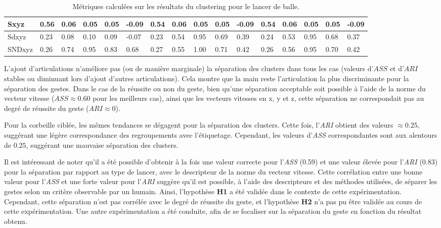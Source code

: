 \begin{landscape}
\begin{table}[]
\begin{tabular}{|l|l|l|l|l|l|l|l|l|l|l|l|l|l|l|l|}
Sxyz   & \cellcolor{green!25} 0.56 & 0.06 & 0.05 & 0.05 & -0.09 & 0.54 & 0.06 & 0.05 & 0.05 & -0.09 & 0.54 & 0.06 & 0.05 & 0.05 & -0.09 \\ \hline
Sdxyz  & 0.23 & 0.08 & 0.10 & 0.09 & -0.07 & 0.23 & 0.54 & 0.95 & 0.69 & 0.39  & 0.24 & 0.53 & 0.95 & 0.68 & 0.37  \\ \hline
SNDxyz & 0.26 & 0.74 & 0.95 & 0.83 & 0.68  & 0.27 & 0.55 & 1.00 & 0.71 & 0.42  & 0.26 & 0.56 & 0.95 & 0.70 & 0.42  \\ \hline
\end{tabular}
\caption{Métriques calculées sur les résultats du clustering pour le lancer de balle.}
\label{throwing_results}
\end{table}
\end{landscape}

L'ajout d'articulations n'améliore pas (ou de manière marginale) la séparation des clusters dans tous les cas (valeurs d'$ASS$ et d'$ARI$ stables ou diminuant lors d'ajout d'autres articulations). Cela montre que la main reste l'articulation la plus discriminante pour la séparation des gestes. Dans le cas de la réussite ou non du geste, bien qu'une séparation acceptable soit possible à l'aide de la norme du vecteur vitesse ($ASS \approx 0.60$ pour les meilleurs cas), ainsi que les vecteurs vitesses en x, y et z, cette séparation ne correspondait pas au degré de réussite du geste ($ARI \approx 0$).

Pour la corbeille ciblée, les mêmes tendances se dégagent pour la séparation des clusters. Cette fois, l'\textit{ARI} obtient des valeurs $\approx 0.25$, suggérant une légère correspondance des regroupements avec l'étiquetage. Cependant, les valeurs d'\textit{ASS} correspondantes sont aux alentours de $0.25$, suggérant une mauvaise séparation des clusters.

Il est intéressant de noter qu'il a été possible d'obtenir à la fois une valeur correcte pour l'\textit{ASS} (0.59) et une valeur élevée pour l'\textit{ARI} (0.83) pour la séparation par rapport au type de lancer, avec le descripteur de la norme du vecteur vitesse. Cette corrélation entre une bonne valeur pour l'\textit{ASS} et une forte valeur pour l'\textit{ARI} suggère qu'il est possible, à l'aide des descripteurs et des méthodes utilisées, de séparer les gestes selon un critère observable par un humain. Ainsi, l'hypothèse \textbf{H1} a été validée dans le contexte de cette expérimentation. Cependant, cette séparation n'est pas corrélée avec le degré de réussite du geste, et l'hypothèse \textbf{H2} n'a pas pu être validée au cours de cette expérimentation. Une autre expérimentation a été conduite, afin de se focaliser sur la séparation du geste en fonction du résultat obtenu.

